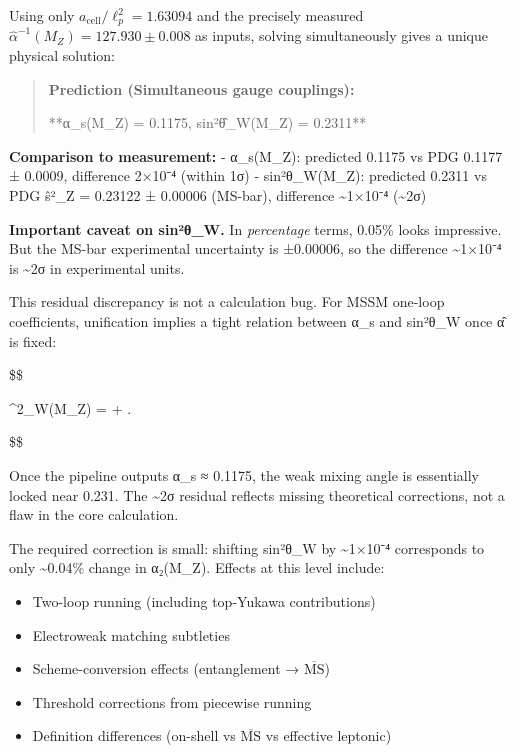 \documentclass[11pt,a4paper]{article}
\theoremstyle{remark}
\providecommand{\tightlist}{%
  \setlength{\itemsep}{0pt}\setlength{\parskip}{0pt}}
\begin{document}
Using only \(a_{\mathrm{cell}}/\ell_p^2 = 1.63094\) and the precisely measured
\(\hat{\alpha}^{-1}(M_Z) = 127.930 \pm 0.008\) as inputs, solving simultaneously
gives a unique physical solution:

\begin{quote}
\textbf{Prediction (Simultaneous gauge couplings):}

**α\_s(M\_Z) = 0.1175, sin²θ̂\_W(M\_Z) = 0.2311**
\end{quote}

\textbf{Comparison to measurement:}
- α\_s(M\_Z): predicted 0.1175 vs PDG 0.1177 ± 0.0009, difference 2×10⁻⁴ (within 1σ)
- sin²θ\_W(M\_Z): predicted 0.2311 vs PDG ŝ²\_Z = 0.23122 ± 0.00006 (MS-bar), difference \textasciitilde1×10⁻⁴ (\textasciitilde2σ)

\textbf{Important caveat on sin²θ\_W.} In \emph{percentage} terms, 0.05\% looks impressive. But
the MS-bar experimental uncertainty is ±0.00006, so the difference \textasciitilde1×10⁻⁴ is
\textasciitilde2σ in experimental units.

This residual discrepancy is not a calculation bug. For MSSM one-loop coefficients,
unification implies a tight relation between α\_s and sin²θ\_W once α̂ is fixed:

\$\$

\sin\^{}2\hat{\theta}\_W(M\_Z) =  + .

\$\$

Once the pipeline outputs α\_s ≈ 0.1175, the weak mixing angle is essentially
locked near 0.231. The \textasciitilde2σ residual reflects missing theoretical corrections,
not a flaw in the core calculation.

The required correction is small: shifting sin²θ\_W by \textasciitilde1×10⁻⁴ corresponds to
only \textasciitilde0.04\% change in α₂(M\_Z). Effects at this level include:

\begin{itemize}
\tightlist
\item
  Two-loop running (including top-Yukawa contributions)
\item
  Electroweak matching subtleties
\item
  Scheme-conversion effects (entanglement → \(\overline{\text{MS}}\))
\item
  Threshold corrections from piecewise running
\item
  Definition differences (on-shell vs \(\overline{\text{MS}}\) vs effective leptonic)
\end{itemize}
\end{document}
